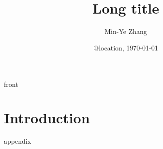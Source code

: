 \documentclass[presentation]{beamer}
\author[MY Zhang]{Min-Ye Zhang}
\date[\today]{@location, \today}
\title[Short title]{Long title}
\institute[CCME, PKU]{College of Chemistry and Molecular Engineering\\ Peking University}
\begin{document}
{front}
\section{Introduction}
{appendix}
\end{document}
